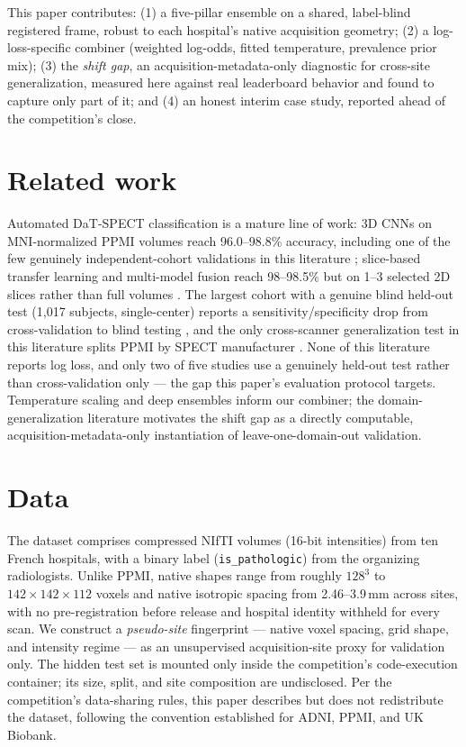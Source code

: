 \documentclass{article}
\begin{document}
This paper contributes: (1) a five-pillar ensemble on a shared, label-blind registered frame, robust to each hospital's native acquisition geometry; (2) a log-loss-specific combiner (weighted log-odds, fitted temperature, prevalence prior mix); (3) the \emph{shift gap}, an acquisition-metadata-only diagnostic for cross-site generalization, measured here against real leaderboard behavior and found to capture only part of it; and (4) an honest interim case study, reported ahead of the competition's close.

\section{Related work}
\label{sec:related}

Automated DaT-SPECT classification is a mature line of work: 3D CNNs on MNI-normalized PPMI volumes reach 96.0--98.8\% accuracy, including one of the few genuinely independent-cohort validations in this literature \cite{choi2017}; slice-based transfer learning and multi-model fusion reach 98--98.5\% but on 1--3 selected 2D slices rather than full volumes \cite{quan2019,ensemblefusion2022}. The largest cohort with a genuine blind held-out test (1{,}017 subjects, single-center) reports a sensitivity/specificity drop from cross-validation to blind testing \cite{zhao2022}, and the only cross-scanner generalization test in this literature splits PPMI by SPECT manufacturer \cite{radiomics2022}. None of this literature reports log loss, and only two of five studies use a genuinely held-out test rather than cross-validation only --- the gap this paper's evaluation protocol targets. Temperature scaling \cite{guo2017} and deep ensembles \cite{lakshminarayanan2017} inform our combiner; the domain-generalization literature \cite{gulrajani2021} motivates the shift gap as a directly computable, acquisition-metadata-only instantiation of leave-one-domain-out validation.

\section{Data}
\label{sec:data}

The dataset comprises compressed NIfTI volumes (16-bit intensities) from ten French hospitals, with a binary label (\texttt{is\_pathologic}) from the organizing radiologists. Unlike PPMI, native shapes range from roughly $128^3$ to $142\times142\times112$ voxels and native isotropic spacing from 2.46--3.9\,mm across sites, with no pre-registration before release and hospital identity withheld for every scan. We construct a \emph{pseudo-site} fingerprint --- native voxel spacing, grid shape, and intensity regime --- as an unsupervised acquisition-site proxy for validation only. The hidden test set is mounted only inside the competition's code-execution container; its size, split, and site composition are undisclosed. Per the competition's data-sharing rules, this paper describes but does not redistribute the dataset, following the convention established for ADNI, PPMI, and UK Biobank.
\end{document}
